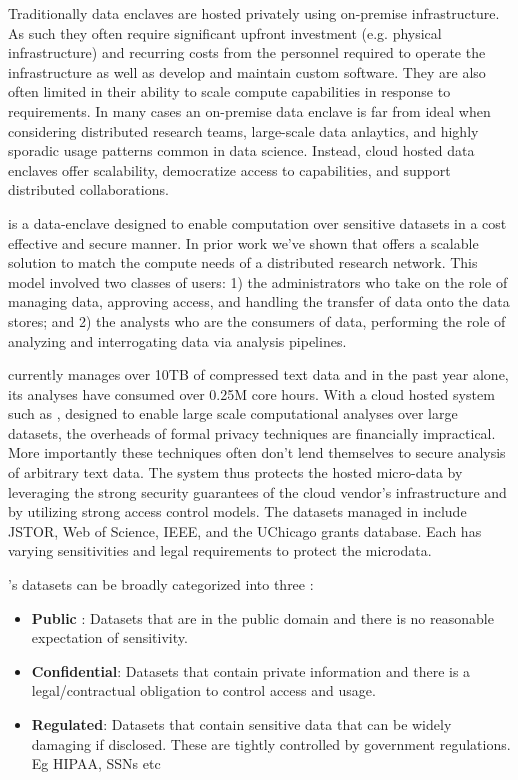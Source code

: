 Traditionally data enclaves are hosted privately using on-premise infrastructure. As 
such they often require significant upfront investment (e.g. physical infrastructure) and recurring costs 
from the personnel required to operate the infrastructure as well as develop and maintain custom software. 
They are also often limited in their ability to scale
compute capabilities in response to requirements. In many cases an on-premise data enclave is far from ideal
when considering distributed research teams, large-scale data anlaytics, and highly sporadic
usage patterns common in data science. Instead, cloud hosted data enclaves offer scalability,
democratize access to capabilities, and support distributed collaborations. 

\NAME is a data-enclave designed to enable computation over sensitive datasets
in a cost effective and secure manner. In prior work we've shown that \NAME offers
a scalable solution to match the compute needs of a distributed research network.
This model involved two classes of users: 1) the administrators who take on the role of managing
data, approving access, and handling the transfer of data onto the data stores; and 2) the analysts
who are the consumers of data, performing the role of analyzing and interrogating data
via analysis pipelines.

\NAME currently manages over 10TB of compressed text data and in the past year
alone, its analyses have consumed over 0.25M core hours. With a cloud hosted system
such as \NAMENS, designed to enable large scale computational analyses over large datasets,
the overheads of formal privacy techniques are financially impractical. More importantly
these techniques often don't lend themselves to secure analysis of arbitrary text data. 
The system thus protects the hosted micro-data by leveraging the strong security
guarantees of the cloud vendor's infrastructure and by utilizing strong access control
models. The datasets managed in \NAME include JSTOR, Web of Science, IEEE,
and the UChicago grants database. Each has varying sensitivities and legal requirements to
protect the microdata.

\NAMENS's datasets can be broadly categorized into three \cite{ist_dataclass}:
\begin{itemize}
\item \textbf{Public} : Datasets that are in the public domain and there is no
  reasonable expectation of sensitivity.
\item \textbf{Confidential}: Datasets that contain private information and there is a legal/contractual obligation to control access and usage.
\item \textbf {Regulated}: Datasets that contain sensitive data that can be widely damaging if disclosed.
  These are tightly controlled by government regulations. Eg HIPAA, SSNs etc
\end{itemize}

